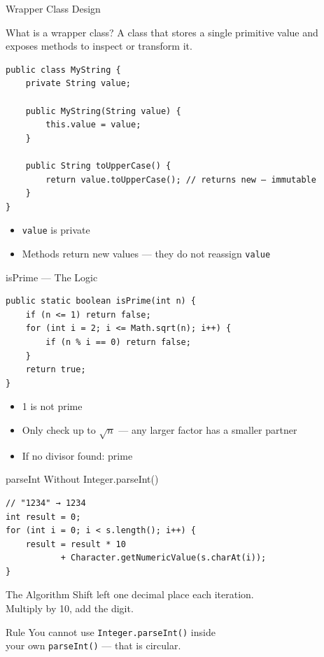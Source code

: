\documentclass{beamer}
\begin{document}
\begin{frame}[fragile]{Wrapper Class Design}
  \begin{block}{What is a wrapper class?}
    A class that stores a single primitive value and\\
    exposes methods to inspect or transform it.
  \end{block}
  \begin{lstlisting}
public class MyString {
    private String value;

    public MyString(String value) {
        this.value = value;
    }

    public String toUpperCase() {
        return value.toUpperCase(); // returns new — immutable
    }
}
  \end{lstlisting}
  \begin{itemize}
    \item \texttt{value} is private
    \item Methods return new values — they do not reassign \texttt{value}
  \end{itemize}
\end{frame}

\begin{frame}[fragile]{isPrime — The Logic}
  \begin{lstlisting}
public static boolean isPrime(int n) {
    if (n <= 1) return false;
    for (int i = 2; i <= Math.sqrt(n); i++) {
        if (n % i == 0) return false;
    }
    return true;
}
  \end{lstlisting}
  \begin{itemize}
    \item 1 is not prime
    \item Only check up to $\sqrt{n}$ — any larger factor has a smaller partner
    \item If no divisor found: prime
  \end{itemize}
\end{frame}

\begin{frame}[fragile]{parseInt Without Integer.parseInt()}
  \begin{lstlisting}
// "1234" → 1234
int result = 0;
for (int i = 0; i < s.length(); i++) {
    result = result * 10
           + Character.getNumericValue(s.charAt(i));
}
  \end{lstlisting}
  \begin{block}{The Algorithm}
    Shift left one decimal place each iteration.\\
    Multiply by 10, add the digit.
  \end{block}
  \begin{alertblock}{Rule}
    You cannot use \texttt{Integer.parseInt()} inside\\
    your own \texttt{parseInt()} — that is circular.
  \end{alertblock}
\end{frame}
\end{document}
